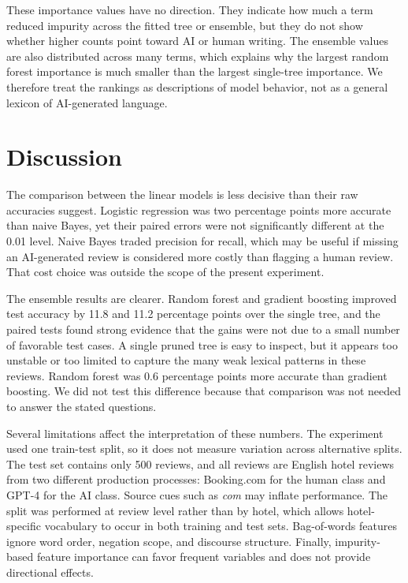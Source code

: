 \documentclass[onecolumn]{jmlr}
\begin{document}
These importance values have no direction. They indicate how much a term reduced impurity across the fitted tree or ensemble, but they do not show whether higher counts point toward AI or human writing. The ensemble values are also distributed across many terms, which explains why the largest random forest importance is much smaller than the largest single-tree importance. We therefore treat the rankings as descriptions of model behavior, not as a general lexicon of AI-generated language.

\section{Discussion}

The comparison between the linear models is less decisive than their raw accuracies suggest. Logistic regression was two percentage points more accurate than naive Bayes, yet their paired errors were not significantly different at the 0.01 level. Naive Bayes traded precision for recall, which may be useful if missing an AI-generated review is considered more costly than flagging a human review. That cost choice was outside the scope of the present experiment.

The ensemble results are clearer. Random forest and gradient boosting improved test accuracy by 11.8 and 11.2 percentage points over the single tree, and the paired tests found strong evidence that the gains were not due to a small number of favorable test cases. A single pruned tree is easy to inspect, but it appears too unstable or too limited to capture the many weak lexical patterns in these reviews. Random forest was 0.6 percentage points more accurate than gradient boosting. We did not test this difference because that comparison was not needed to answer the stated questions.

Several limitations affect the interpretation of these numbers. The experiment used one train-test split, so it does not measure variation across alternative splits. The test set contains only 500 reviews, and all reviews are English hotel reviews from two different production processes: Booking.com for the human class and GPT-4 for the AI class. Source cues such as \emph{com} may inflate performance. The split was performed at review level rather than by hotel, which allows hotel-specific vocabulary to occur in both training and test sets. Bag-of-words features ignore word order, negation scope, and discourse structure. Finally, impurity-based feature importance can favor frequent variables and does not provide directional effects.
\end{document}
